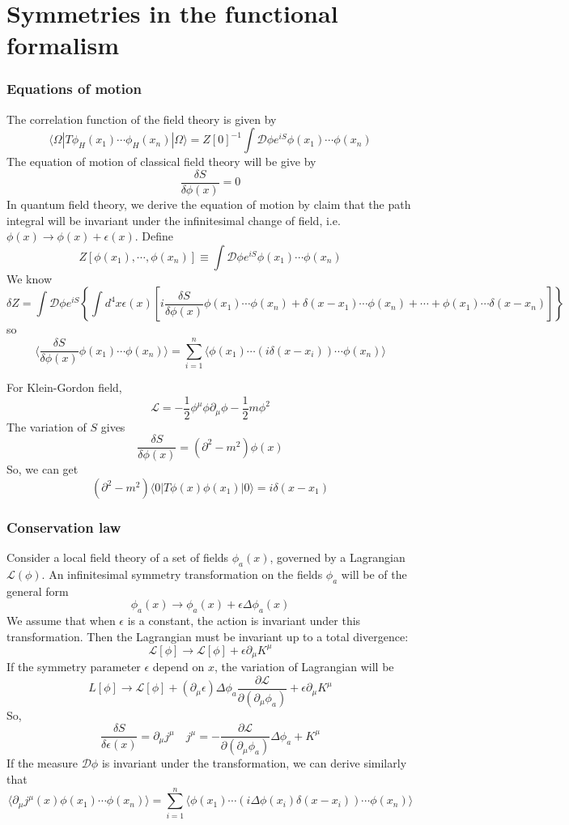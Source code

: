 \section{Symmetries in the functional formalism}
\subsubsection{Equations of motion}
\noindent
The correlation function of the field theory is given by
\[\langle \Omega | T \phi_H(x_1) \cdots \phi_H(x_n) | \Omega \rangle = Z[0]^{-1} \int \mathcal{D}\phi e^{iS} \phi(x_1)\cdots\phi(x_n)\]
The equation of motion of classical field theory will be give by
\[\frac{\delta S}{\delta \phi(x)} = 0\]
In quantum field theory, we derive the equation of motion by claim that the path integral will be invariant under the infinitesimal change of field, i.e. $\phi(x) \to \phi(x) + \epsilon(x)$.
Define
\[Z[\phi(x_1),\cdots,\phi(x_n)] \equiv  \int \mathcal{D}\phi e^{iS} \phi(x_1)\cdots\phi(x_n)\]
We know
\[\delta Z = \int \mathcal{D}\phi e^{iS} \left\{ \int d^4x \epsilon(x) \left[ i\frac{\delta S}{\delta \phi(x)} \phi(x_1)\cdots\phi(x_n) + \delta(x-x_1)\cdots\phi(x_n) + \cdots + \phi(x_1)\cdots\delta(x-x_n) \right]\right\} \]
so
\[\langle \frac{\delta S}{\delta \phi(x)} \phi(x_1)\cdots\phi(x_n) \rangle  = \sum_{i=1}^{n} \langle \phi(x_1) \cdots (i\delta(x-x_i)) \cdots \phi(x_n) \rangle\]
\begin{example}
For Klein-Gordon field,
\[\mathcal{L} = -\frac{1}{2}\phi^{\mu}\phi \partial_{\mu}\phi - \frac{1}{2}m\phi^2\]
The variation of $S$ gives
\[\frac{\delta S}{\delta \phi(x)} = (\partial^2-m^2)\phi(x)\]
So, we can get
\[(\partial^2-m^2) \langle 0 | T \phi(x)\phi(x_1)| 0 \rangle = i\delta(x-x_1)\]
\end{example}
\subsubsection{Conservation law}
Consider a local field theory of a set of fields $\phi_a(x)$, governed by a Lagrangian $\mathcal{L}(\phi)$. An infinitesimal symmetry transformation on the fields $\phi_a$ will be of the general form 
\[\phi_a(x) \to \phi_a(x) + \epsilon \Delta \phi_a(x)\]
We assume that when $\epsilon$ is a constant, the action is invariant under this transformation. Then the Lagrangian must be invariant up to a total divergence:
\[\mathcal{L}[\phi] \to \mathcal{L}[\phi] + \epsilon \partial_{\mu} K^{\mu}\]
If the symmetry parameter $\epsilon$ depend on $x$, the variation of Lagrangian will be
\[L[\phi] \to \mathcal{L}[\phi] + (\partial_{\mu}\epsilon)\Delta \phi_a \frac{\partial \mathcal{L}}{\partial (\partial_{\mu}\phi_a)} + \epsilon \partial_{\mu} K^{\mu}\]
So, 
\[\frac{\delta S}{\delta \epsilon(x)} = \partial_{\mu} j^{\mu} \quad j^{\mu} = -\frac{\partial \mathcal{L}}{\partial (\partial_{\mu}\phi_a)}\Delta \phi_a + K^{\mu} \]
If the measure $\mathcal{D}\phi$ is invariant under the transformation, we can derive similarly that
\[\langle \partial_{\mu} j^{\mu}(x) \phi(x_1)\cdots\phi(x_n) \rangle  = \sum_{i=1}^{n} \langle \phi(x_1) \cdots (i\Delta \phi(x_i)\delta(x-x_i)) \cdots \phi(x_n) \rangle\]

